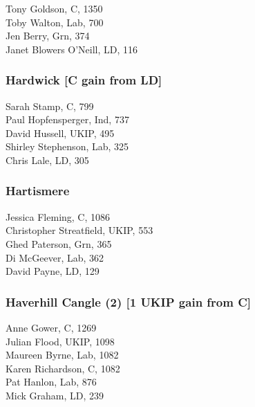 \documentclass[a4paper,openany,10pt]{book}
\begin{document}
Tony Goldson, C, 1350\\
Toby Walton, Lab, 700\\
Jen Berry, Grn, 374\\
Janet Blowers O'Neill, LD, 116\\


\subsubsection*{Hardwick \hspace*{\fill}\nolinebreak[1]%
\enspace\hspace*{\fill}
[C gain from LD]}



Sarah Stamp, C, 799\\
Paul Hopfensperger, Ind, 737\\
David Hussell, UKIP, 495\\
Shirley Stephenson, Lab, 325\\
Chris Lale, LD, 305\\


\subsubsection*{Hartismere}



Jessica Fleming, C, 1086\\
{Christopher Streatfield}, UKIP, 553\\
Ghed Paterson, Grn, 365\\
Di McGeever, Lab, 362\\
David Payne, LD, 129\\


\subsubsection*{Haverhill Cangle (2) \hspace*{\fill}\nolinebreak[1]%
\enspace\hspace*{\fill}
[1 UKIP gain from C]}



Anne Gower, C, 1269\\
Julian Flood, UKIP, 1098\\
Maureen Byrne, Lab, 1082\\
Karen Richardson, C, 1082\\
Pat Hanlon, Lab, 876\\
Mick Graham, LD, 239\\
\end{document}
